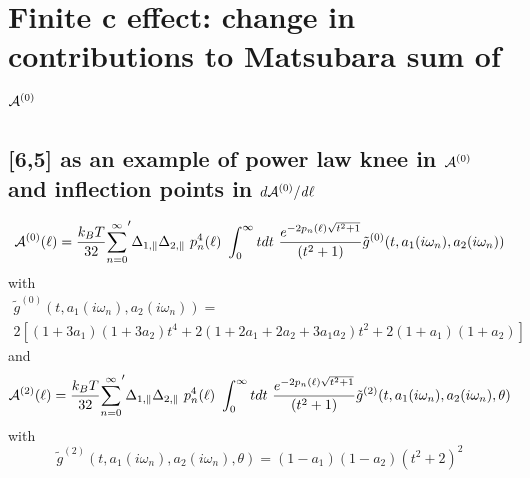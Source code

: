 \documentclass[a4paper]{article}
\begin{document}
\section{Finite c effect: change in contributions to Matsubara sum of
${\cal A}^{(0)}$}
\subsection{[6,5] as an example of power law knee in ${\cal A}^{(0)}$ and
    inflection points in $d {\cal A}^{(0)} / \it{d}\ell$}
\begin{center}
\begin{equation}
{\cal A}^{(0)}(\ell) = \frac{k_BT}{32}  {\sum_{n=0}^{\infty}}' \Delta_{1,\parallel} \Delta_{2,\parallel} ~p_n^{4}(\ell) ~\int_0^{\infty} t dt ~\frac{e^{- 2 p_n(\ell) \sqrt{t^{2} + 1}}}{(t^{2} + 1)} \tilde g^{(0)}(t, a_1(i \omega_n), a_2(i \omega_n))
\end{equation}
with
\begin{multline*}
\tilde g^{(0)}(t, a_1(i \omega_n), a_2(i \omega_n)) = \\ 
2 \left[ (1+3a_1)(1+3a_2) t^{4} + 2 (1+2a_1+2a_2+3a_1a_2) t^{2}  + 2(1+a_1)(1+a_2)\right]
\end{multline*}
and
\begin{equation}
{\cal A}^{(2)}(\ell) = \frac{k_BT}{32}  {\sum_{n=0}^{\infty}}' \Delta_{1,\parallel} \Delta_{2,\parallel} ~p_n^{4}(\ell) ~\int_0^{\infty} t dt ~\frac{e^{- 2 p_n(\ell) \sqrt{t^{2} + 1}}}{(t^{2} + 1)} \tilde g^{(2)}(t, a_1(i \omega_n), a_2(i \omega_n), \theta)
\end{equation}
with
\begin{equation}
\tilde g^{(2)}(t, a_1(i \omega_n), a_2(i \omega_n), \theta) = (1-a_1)(1-a_2)(t^{2} + 2)^2
\label{befgqw}
\end{equation}


\end{center}
\end{document}
